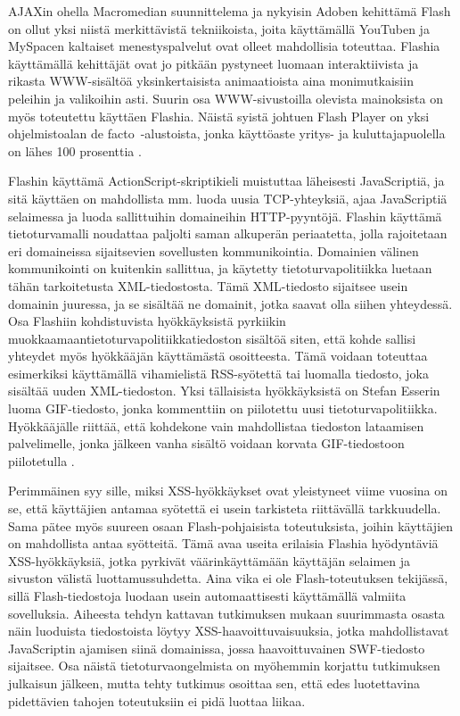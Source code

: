 AJAXin ohella Macromedian suunnittelema ja nykyisin Adoben kehittämä Flash on ollut yksi niistä merkittävistä tekniikoista, joita käyttämällä YouTuben ja MySpacen kaltaiset 
menestyspalvelut ovat olleet mahdollisia toteuttaa. Flashia käyttämällä kehittäjät ovat jo pitkään pystyneet luomaan interaktiivista ja rikasta WWW-sisältöä
yksinkertaisista animaatioista aina monimutkaisiin peleihin ja valikoihin asti. Suurin osa WWW-sivustoilla olevista mainoksista on myös toteutettu käyttäen Flashia. Näistä syistä johtuen 
Flash Player on yksi ohjelmistoalan de facto~-alustoista, jonka käyttöaste yritys- ja kuluttajapuolella on lähes 100 prosenttia \cite{Flash}.

Flashin käyttämä ActionScript-skriptikieli muistuttaa läheisesti JavaScriptiä, ja sitä käyttäen on mahdollista mm. luoda uusia TCP-yhteyksiä, ajaa JavaScriptiä selaimessa ja luoda 
sallittuihin domaineihin HTTP-pyyntöjä. Flashin käyttämä tietoturvamalli noudattaa paljolti saman alkuperän periaatetta, jolla rajoitetaan eri domaineissa sijaitsevien sovellusten 
kommunikointia. Domainien välinen kommunikointi on kuitenkin sallittua, ja käytetty tietoturvapolitiikka luetaan tähän tarkoitetusta XML-tiedostosta. Tämä XML-tiedosto sijaitsee usein 
domainin juuressa, ja se sisältää ne domainit, jotka saavat olla siihen yhteydessä. Osa Flashiin kohdistuvista hyökkäyksistä pyrkiikin muokkaamaantietoturvapolitiikkatiedoston sisältöä
siten, että kohde sallisi yhteydet myös hyökkääjän käyttämästä osoitteesta. Tämä voidaan toteuttaa esimerkiksi käyttämällä vihamielistä RSS-syötettä tai luomalla tiedosto, joka sisältää
uuden XML-tiedoston. Yksi tällaisista hyökkäyksistä on Stefan Esserin luoma GIF-tiedosto, jonka kommenttiin on piilotettu uusi tietoturvapolitiikka. Hyökkääjälle riittää, että kohdekone 
vain mahdollistaa tiedoston lataamisen palvelimelle, jonka jälkeen vanha sisältö voidaan korvata GIF-tiedostoon piilotetulla \cite{WEB2}.

Perimmäinen syy sille, miksi XSS-hyökkäykset ovat yleistyneet viime vuosina on se, että käyttäjien antamaa syötettä ei usein tarkisteta riittävällä tarkkuudella. Sama pätee myös suureen 
osaan Flash-pohjaisista toteutuksista, joihin käyttäjien on mahdollista antaa syötteitä. Tämä avaa useita erilaisia Flashia hyödyntäviä XSS-hyökkäyksiä, jotka pyrkivät väärinkäyttämään 
käyttäjän selaimen ja sivuston välistä luottamussuhdetta. Aina vika ei ole Flash-toteutuksen tekijässä, sillä Flash-tiedostoja luodaan usein automaattisesti käyttämällä valmiita 
sovelluksia. Aiheesta tehdyn kattavan tutkimuksen mukaan \cite{FlashXSS} suurimmasta osasta näin luoduista tiedostoista löytyy XSS-haavoittuvaisuuksia, jotka mahdollistavat JavaScriptin
ajamisen siinä domainissa, jossa haavoittuvainen SWF-tiedosto sijaitsee. Osa näistä tietoturvaongelmista on myöhemmin korjattu tutkimuksen julkaisun jälkeen, mutta tehty tutkimus osoittaa 
sen, että edes luotettavina pidettävien tahojen toteutuksiin ei pidä luottaa liikaa.

